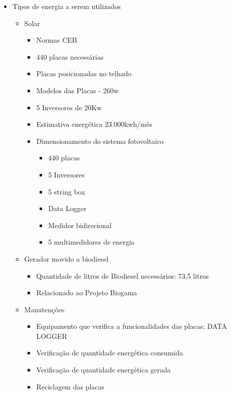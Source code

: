 \begin{apendicesenv}
  \begin{itemize}
    \item Tipos de energia a serem utilizados
    \begin{itemize}
      \item Solar
        \begin{itemize}
          \item Normas CEB
          \item 440 placas necessárias 
          \item Placas posicionadas no telhado
          \item Modelos das Placas - 260w
          \item 5 Inversores de 20Kw
          \item Estimativa energética 23.000kwh/mês
          \item Dimensionamento do sistema fotovoltaico 
          \begin{itemize}
          \item 440 placas
      \item 5 Inversores
        \item 5 string box
      \item Data Logger
      \item Medidor bidirecional 
      \item 5 multimedidores de energia
          \end{itemize}
        \end{itemize}
      \item Gerador movido a biodiesel
      \begin{itemize}
          \item Quantidade de litros de Biodiesel necessários: 73,5 litros 
      \item Relacionado ao Projeto  Biogama
          \end{itemize}
      \item Manutenções
      \begin{itemize}
      \item Equipamento que verifica a funcionalidades das placas: DATA LOGGER
    \item Verificação de quantidade energética consumida
    \item Verificação de quantidade energética gerada
    \item Reciclagem das placas
      \end{itemize}
    \end{itemize}
  \end{itemize}


\end{apendicesenv}
